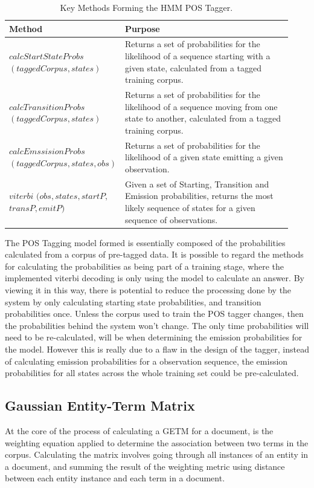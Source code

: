 \documentclass[10pt]{report}
\begin{document}
\renewcommand{\baselinestretch}{1.0}\normalsize
\renewcommand{\arraystretch}{2.0}
\begin{table}[h!]
  \begin{tabular}{>{\raggedright}p{0.3\linewidth} | p{0.63\linewidth}}
    Method & Purpose\\
    \hline
    $calcStartStateProbs$ $(taggedCorpus, states)$& Returns a set of probabilities for the likelihood of a sequence starting with a given state, calculated from a tagged training corpus. \\
    $calcTransitionProbs$ $(taggedCorpus, states)$ & Returns a set of probabilities for the likelihood of a sequence moving from one state to another, calculated from a tagged training corpus. \\
    $calcEmssisionProbs$ $(taggedCorpus, states, obs)$ & Returns a set of probabilities for the likelihood of a given state emitting a given observation.\\
    $viterbi$ $(obs, states, startP,$ $transP, emitP)$ & Given a set of Starting, Transition and Emission probabilities, returns the most likely sequence of states for a given sequence of observations. 
  \end{tabular}
  \caption{Key Methods Forming the HMM POS Tagger.\label{tab:pos_tagging_methods}}
\end{table}
\renewcommand{\baselinestretch}{2.0}\normalsize
\renewcommand{\arraystretch}{1.0}

The POS Tagging model formed is essentially composed of the probabilities calculated from a corpus of pre-tagged data. It is possible to regard the methods for calculating the probabilities as being part of a training stage, where the implemented viterbi decoding is only using the model to calculate an answer. By viewing it in this way, there is potential to reduce the processing done by the system by only calculating starting state probabilities, and transition probabilities once. Unless the corpus used to train the POS tagger changes, then the probabilities behind the system won't change. The only time probabilities will need to be re-calculated, will be when determining the emission probabilities for the model. However this is really due to a flaw in the design of the tagger, instead of calculating emission probabilities for a observation sequence, the emission probabilities for all states across the whole training set could be pre-calculated.

\subsection{Gaussian Entity-Term Matrix}
At the core of the process of calculating a GETM for a document, is the weighting equation applied to determine the association between two terms in the corpus. Calculating the matrix involves going through all instances of an entity in a document, and summing the result of the weighting metric using distance between each entity instance and each term in a document.
\end{document}
